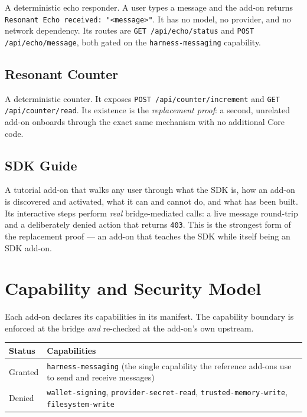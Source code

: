 \documentclass[11pt]{article}
\begin{document}
A deterministic echo responder. A user types a message and the add-on returns
\texttt{Resonant Echo received: "<message>"}. It has no model, no provider, and
no network dependency. Its routes are \texttt{GET /api/echo/status} and
\texttt{POST /api/echo/message}, both gated on the \texttt{harness-messaging}
capability.

\subsection{Resonant Counter}

A deterministic counter. It exposes \texttt{POST /api/counter/increment} and
\texttt{GET /api/counter/read}. Its existence is the \emph{replacement proof}:
a second, unrelated add-on onboards through the exact same mechanism with no
additional Core code.

\subsection{SDK Guide}

A tutorial add-on that walks any user through what the SDK is, how an add-on is
discovered and activated, what it can and cannot do, and what has been built.
Its interactive steps perform \emph{real} bridge-mediated calls: a live message
round-trip and a deliberately denied action that returns \texttt{403}. This is
the strongest form of the replacement proof --- an add-on that teaches the SDK
while itself being an SDK add-on.

\section{Capability and Security Model}

Each add-on declares its capabilities in its manifest. The capability boundary
is enforced at the bridge \emph{and} re-checked at the add-on's own upstream.

\begin{center}
\begin{tabular}{@{}p{3.4cm}p{7.6cm}@{}}
\toprule
\textbf{Status} & \textbf{Capabilities} \\
\midrule
Granted & \texttt{harness-messaging} (the single capability the reference
           add-ons use to send and receive messages) \\
\hline
Denied & \texttt{wallet-signing}, \texttt{provider-secret-read},
         \texttt{trusted-memory-write}, \texttt{filesystem-write} \\
\bottomrule
\end{tabular}
\end{center}
\end{document}
